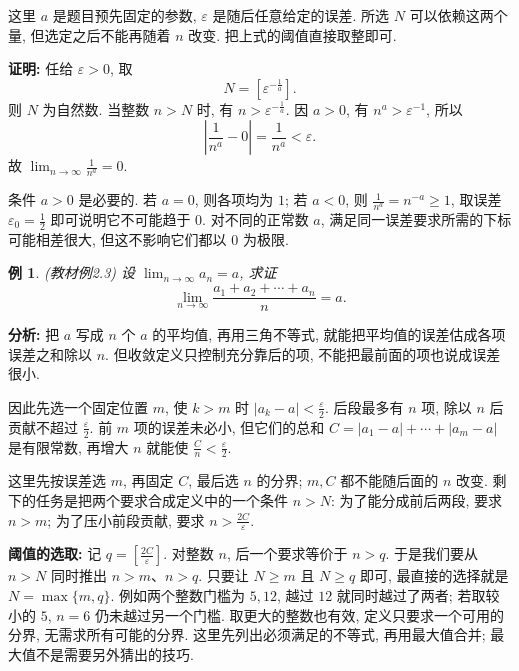 \documentclass[UTF8,openany]{ctexbook}
\theoremstyle{chinesetextbook}
\newtheorem{example}{例}[section]
\newenvironment{cnproof}{\par\indent\textbf{证明:} \ignorespaces}{\par}
\begin{document}
这里 $a$ 是题目预先固定的参数, $\varepsilon$ 是随后任意给定的误差. 所选 $N$ 可以依赖这两个量, 但选定之后不能再随着 $n$ 改变. 把上式的阈值直接取整即可.

\begin{cnproof}
任给 $\varepsilon>0$, 取
\[
N=\left[\varepsilon^{-\frac1a}\right].
\]
则 $N$ 为自然数. 当整数 $n>N$ 时, 有 $\displaystyle n>\varepsilon^{-\frac1a}$. 因 $a>0$, 有 $n^a>\varepsilon^{-1}$, 所以
\[
\left|\frac1{n^a}-0\right|=\frac1{n^a}<\varepsilon.
\]
故 $\displaystyle \lim_{n\to\infty}\frac{1}{n^a}=0$.
\end{cnproof}

条件 $a>0$ 是必要的. 若 $a=0$, 则各项均为 $1$; 若 $a<0$, 则 $\displaystyle \frac{1}{n^a}=n^{-a}\ge1$, 取误差 $\displaystyle \varepsilon_0=\frac{1}{2}$ 即可说明它不可能趋于 $0$. 对不同的正常数 $a$, 满足同一误差要求所需的下标可能相差很大, 但这不影响它们都以 $0$ 为极限.

\begin{example}
\textnormal{(教材例2.3)} 设 $\displaystyle \lim_{n\to\infty}a_n=a$, 求证
\[
\lim_{n\to\infty}\frac{a_1+a_2+\cdots+a_n}{n}=a.
\]
\end{example}

\par\indent\textbf{分析:} 把 $a$ 写成 $n$ 个 $a$ 的平均值, 再用三角不等式, 就能把平均值的误差估成各项误差之和除以 $n$. 但收敛定义只控制充分靠后的项, 不能把最前面的项也说成误差很小.

因此先选一个固定位置 $m$, 使 $k>m$ 时 $\displaystyle|a_k-a|<\frac\varepsilon2$. 后段最多有 $n$ 项, 除以 $n$ 后贡献不超过 $\displaystyle\frac\varepsilon2$. 前 $m$ 项的误差未必小, 但它们的总和 $C=|a_1-a|+\cdots+|a_m-a|$ 是有限常数, 再增大 $n$ 就能使 $\displaystyle\frac Cn<\frac\varepsilon2$.

这里先按误差选 $m$, 再固定 $C$, 最后选 $n$ 的分界; $m,C$ 都不能随后面的 $n$ 改变. 剩下的任务是把两个要求合成定义中的一个条件 $n>N$: 为了能分成前后两段, 要求 $n>m$; 为了压小前段贡献, 要求 $\displaystyle n>\frac{2C}\varepsilon$.

\par\indent\textbf{阈值的选取:} 记 $\displaystyle q=[\frac{2C}\varepsilon]$. 对整数 $n$, 后一个要求等价于 $n>q$. 于是我们要从 $n>N$ 同时推出 $n>m$、$n>q$. 只要让 $N\ge m$ 且 $N\ge q$ 即可, 最直接的选择就是 $N=\max\{m,q\}$. 例如两个整数门槛为 $5,12$, 越过 $12$ 就同时越过了两者; 若取较小的 $5$, $n=6$ 仍未越过另一个门槛. 取更大的整数也有效, 定义只要求一个可用的分界, 无需求所有可能的分界. 这里先列出必须满足的不等式, 再用最大值合并; 最大值不是需要另外猜出的技巧.
\end{document}

